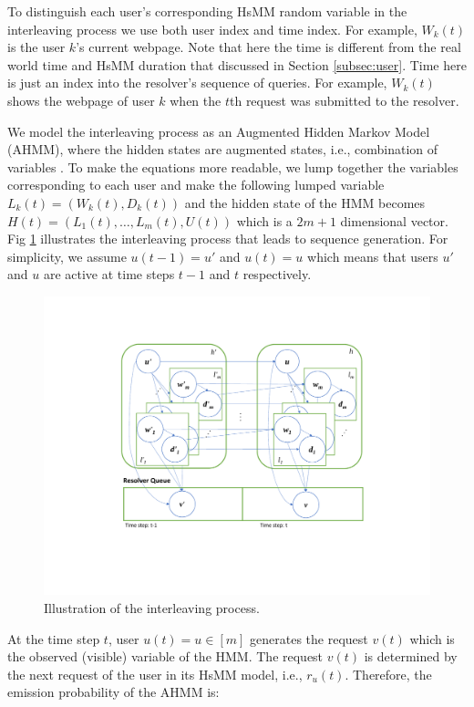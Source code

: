 	To distinguish each user's corresponding HsMM random variable in the interleaving process we use both user index and time index. For example, $W_{k}(t)$ is the user $k$'s current webpage. 
	Note that here the time is different from the real world time and HsMM duration that discussed in Section \ref{subsec:user}. 
	Time here is just an index into the resolver's sequence of queries.
	For example, $W_{k}(t)$ shows the webpage of user $k$ when the $t$th request was submitted to the resolver. 
	
	We model the interleaving process as an Augmented Hidden Markov Model (AHMM), where the hidden states are augmented states, i.e., combination of variables \cite{minot2014separation}. 
	To make the equations more readable, we lump together the variables corresponding to each user and make the following lumped variable $L_k(t) = (W_{k}(t), D_{k}(t))$ and the hidden state of the HMM becomes $H(t) = (L_1(t), \dots, L_m(t), U(t))$ which is a $2m +1$ dimensional vector.
	Fig \ref{fig:rq} illustrates the interleaving process that leads to sequence generation.
	For simplicity, we assume $u(t-1) = u'$ and $u(t) = u$ which means that users $u'$ and $u$ are active at time steps $t-1$ and $t$ respectively. 
	\begin{figure}
		\centering
		\includegraphics[width=.45\textwidth]{./img/hsmm-q2}
		\caption{Illustration of the interleaving process.}
		\label{fig:rq}
	\end{figure} 
	
	At the time step $t$, user $u(t) = u \in [m]$ generates the request $v(t)$ which is the observed (visible) variable of the HMM.
	The request $v(t)$ is determined by the next request of the user in its HsMM model, i.e., $r_{u}(t)$.	
	Therefore, the emission probability of the AHMM is:

